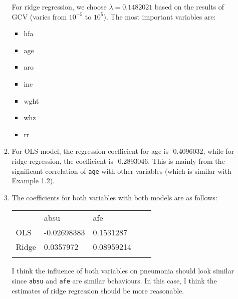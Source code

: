 \documentclass{article}
\begin{document}
\begin{enumerate}
\begin{enumerate}
For ridge regression, we choose $\lambda = 0.1482021$ based on the results of GCV (varies from $10^{-5} $ to $10^5 $). The most important variables are:
\begin{itemize} \itemsep -2pt
\item hfa
\item age
\item aro
\item inc
\item wght
\item whz
\item rr
\end{itemize}

\item For OLS model, the regression coefficient for age is -0.4096032, while for ridge regression, the coefficient is -0.2893046. This is mainly from the significant correlation of \texttt{age} with other variables (which is similar with Example 1.2).

\item The coefficients for both variables with both models are as follows:
\begin{table}[h]
\centering
\begin{tabular}{lllll}
\cline{1-3}
\multicolumn{1}{|l|}{}      & \multicolumn{1}{l|}{absu}        & \multicolumn{1}{l|}{afe}        &  &  \\ \cline{1-3}
\multicolumn{1}{|l|}{OLS}   & \multicolumn{1}{l|}{-0.02698383} & \multicolumn{1}{l|}{0.1531287}  &  &  \\ \cline{1-3}
\multicolumn{1}{|l|}{Ridge} & \multicolumn{1}{l|}{0.0357972}   & \multicolumn{1}{l|}{0.08959214} &  &  \\ \cline{1-3}
                            &                                  &                                 &  & 
\end{tabular}
\end{table}
I think the influence of both variables on pneumonia should look similar since \texttt{absu} and \texttt{afe} are similar behaviours. In this case, I think the estimates of ridge regression should be more reasonable.

\end{enumerate}


\end{enumerate}
\end{document}
